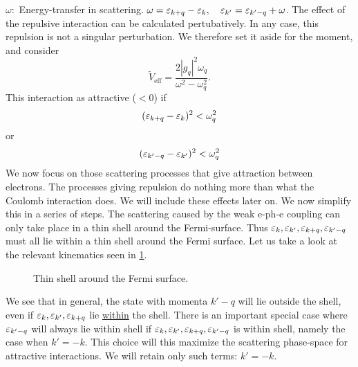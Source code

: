 $\omega:$ Energy-transfer in scattering. $\omega = \varepsilon_{k+q} - \varepsilon_k, \quad \varepsilon_{k'} = \varepsilon_{k'-q} + \omega$.
The effect of the repulsive interaction can be calculated pertubatively. In any case, this repulsion is not a singular perturbation. We therefore set it aside for the moment, and consider
\begin{equation}
	\tilde{V}_{\text{eff}} = \frac{2|g_q|^2\omega_q}{\omega^2 - \omega_q^2}.
\end{equation}
This interaction as attractive ($<0$) if \[(\varepsilon_{k+q}-\varepsilon_k) ^2<\omega_q^2\] or \[(\varepsilon_{k'-q}-\varepsilon_{k'})^2 <\omega_q^2\]
We now focus on those scattering processes that give attraction between electrons. The processes giving repulsion do nothing more than what the Coulomb interaction does. We will include these effects later on. We now simplify this in a series of steps.
The scattering caused by the weak e-ph-e coupling can only take place in a thin shell around the Fermi-surface. Thus $\varepsilon_{k}, \varepsilon_{k'}, \varepsilon_{k+q}, \varepsilon_{k'-q}$ must all lie within a thin shell around the Fermi surface. Let us take a look at the relevant kinematics seen in \cref{fig:FS_shell}.
\begin{figure}
	\centering
	
	\caption{Thin shell around the Fermi surface.}
	\label{fig:FS_shell}
\end{figure}
We see that in general, the state with momenta $k' -q$ will lie outside the shell, even if $\varepsilon_{k}, \varepsilon_{k'}, \varepsilon_{k+q}$ lie \underline{within} the shell. There is an important special case where $\varepsilon_{k'-q}$ will always lie within shell if $\varepsilon_{k}, \varepsilon_{k'}, \varepsilon_{k+q}, \varepsilon_{k'-q}$ is within shell, namely the case when $k' = -k$. 
This choice will this maximize the scattering phase-space for attractive interactions. We will retain only such terms: $k' = -k$. 

